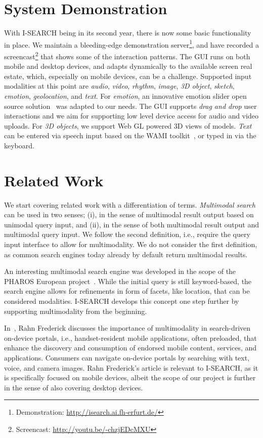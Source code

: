 \documentclass{acm_proc_article-sp}
\let\oldemph\emph
\renewcommand{\emph}[1]{\oldemph{\fontsize{9}{9}\selectfont #1}}
\newcommand{\inlinelistingsize}{\fontsize{8pt}{11pt}}
\let\oldurl\url
\renewcommand{\url}[1]{\inlinelistingsize\oldurl{#1}}
\begin{document}
\section{System Demonstration} \label{sec:systemdemonstration}
With \mbox{I-SEARCH} being in its second year, there is now some basic functionality in place.
We maintain a bleeding-edge demonstration server\footnote{Demonstration: \url{http://isearch.ai.fh-erfurt.de/}}, and have recorded a screencast\footnote{Screencast: \url{http://youtu.be/-chzjEDcMXU}} that shows some of the interaction patterns.
The GUI runs on both mobile and desktop devices, and adapts dynamically to the available screen real estate, which, especially on mobile devices, can be a challenge.
Supported input modalities at this point are \emph{audio}, \emph{video}, \emph{rhythm}, \emph{image}, \emph{3D object}, \emph{sketch}, \emph{emotion}, \emph{geolocation}, and \emph{text}.
For \emph{emotion}, an innovative emotion slider open source solution~\cite{emotionslider} was adapted to our needs.
The GUI supports \textit{drag and drop} user interactions and we aim for supporting low level device access for audio and video uploads.
For \emph{3D objects}, we support Web GL powered 3D views of models.
\emph{Text} can be entered via speech input based on the WAMI toolkit~\cite{wami}, or typed in via the keyboard.

\section{Related Work} \label{sec:relatedwork}
We start covering related work with a differentiation of terms.
\emph{Multimodal search} can be used in two senses; (i), in the sense of multimodal result output based on unimodal query input, and (ii), in the sense of both multimodal result output and multimodal query input.
We follow the second definition, i.e., require the query input interface to allow for multimodality.
We do not consider the first definition, as common search engines today already by default return multimodal results.

An interesting multimodal search engine was developed in the scope of the PHAROS European project~\cite{pharos2009}.
While the initial query is still keyword-based, the search engine allows for refinements in form of facets, like location, that can be considered modalities.
\mbox{I-SEARCH} develops this concept one step further by supporting multimodality from the beginning.

In~\cite{multimodalitysun}, Rahn Frederick discusses the importance of multimodality in search-driven on-device portals, i.e., handset-resident mobile applications, often preloaded, that enhance the discovery and consumption of endorsed mobile content, services, and applications.
Consumers can navigate on-device portals by searching with text, voice, and camera images.
Rahn Frederick's article is relevant to \mbox{I-SEARCH}, as it is specifically focused on mobile devices, albeit the scope of our project is further in the sense of also covering desktop devices. 
\end{document}
